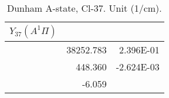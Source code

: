 \begin{table}[h]
\begin{tabular}{crr}
\toprule
$Y_{37} (A^1\Pi)$\\ \midrule 
& 38252.783 & 2.396E-01 \\
& 448.360 & -2.624E-03 \\
& -6.059 \\
\bottomrule
\end{tabular}\caption{Dunham A-state, Cl-37. Unit (1/cm).}\end{table}
